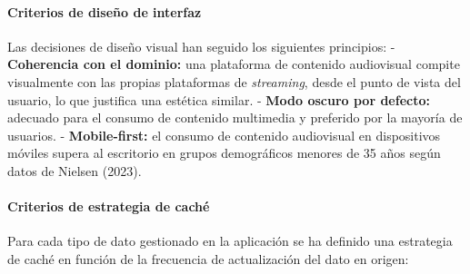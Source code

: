 \documentclass[
]{article}
\begin{document}
\hypertarget{criterios-de-diseuxf1o-de-interfaz}{%
\paragraph{Criterios de diseño de
interfaz}\label{criterios-de-diseuxf1o-de-interfaz}}

Las decisiones de diseño visual han seguido los siguientes principios: -
\textbf{Coherencia con el dominio:} una plataforma de contenido
audiovisual compite visualmente con las propias plataformas de
\emph{streaming}, desde el punto de vista del usuario, lo que justifica
una estética similar. - \textbf{Modo oscuro por defecto:} adecuado para
el consumo de contenido multimedia y preferido por la mayoría de
usuarios. - \textbf{Mobile-first:} el consumo de contenido audiovisual
en dispositivos móviles supera al escritorio en grupos demográficos
menores de 35 años según datos de Nielsen (2023).

\hypertarget{criterios-de-estrategia-de-cachuxe9}{%
\paragraph{Criterios de estrategia de
caché}\label{criterios-de-estrategia-de-cachuxe9}}

Para cada tipo de dato gestionado en la aplicación se ha definido una
estrategia de caché en función de la frecuencia de actualización del
dato en origen:
\end{document}
